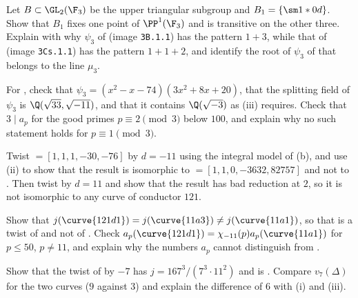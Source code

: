 \begin{exercise}\label{ex:ellcurves:ex-borel}
Let $B\subset\GL_2(\F_3)$ be the upper triangular subgroup and $B_1=\{\sm1*0d\}$. Show that $B_1$ fixes one point of $\PP^1(\F_3)$ and is transitive on the other three. Explain with
 why $\psi_3$ of  (image \texttt{3B.1.1}) has the pattern $1+3$, while that of  (image \texttt{3Cs.1.1}) has the pattern $1+1+2$, and identify
the root of $\psi_3$ of  that belongs to the line $\mu_3$.
\end{exercise}

\begin{exercise}\label{ex:ellcurves:ex-726}
For , check that $\psi_3=(x^2-x-74)(3x^2+8x+20)$, that the splitting field of $\psi_3$ is $\Q(\sqrt{33},\sqrt{-11})$, and that it contains $\Q(\sqrt{-3})$ as (iii)
requires. Check that $3\mid a_p$ for the good primes $p\equiv2\pmod3$ below $100$, and explain why no such statement holds for $p\equiv1\pmod3$.
\end{exercise}

\begin{exercise}\label{ex:ellcurves:ex-121twist}
Twist  $=[1,1,1,-30,-76]$ by $d=-11$ using the integral model of (b), and use (ii) to show that the result is isomorphic to
 $=[1,1,0,-3632,82757]$ and not to . Then twist by $d=11$ and show that the result has bad reduction at $2$, so it is not isomorphic to any curve of conductor $121$.
\end{exercise}

\begin{exercise}\label{ex:ellcurves:ex-121d}
Show that $j(\curve{121d1})=j(\curve{11a3})\ne j(\curve{11a1})$, so that  is a twist of  and not of . Check $a_p(\curve{121d1})=\chi_{-11}(p)a_p(\curve{11a1})$ for
$p\le50$, $p\ne11$, and explain why the numbers $a_p$ cannot distinguish  from .
\end{exercise}

\begin{exercise}\label{ex:ellcurves:ex-539}
Show that the twist of  by $-7$ has $j=167^3/(7^3\cdot11^2)$ and is . Compare $v_7(\Delta)$ for the two curves ($9$ against $3$) and explain the difference of $6$ with
(i) and (iii).
\end{exercise}

